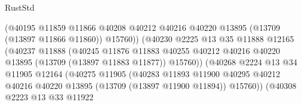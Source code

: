 \begin{lexlean}{RustStd}
\begin{coremodule}
                                        (@40195
                                          @11859
                                          @11866
                                          @40208
                                          @40212
                                          @40216
                                          @40220
                                          @13895
                                          (@13709 (@13897 @11866 @11860))
                                          @15760))
                                      (@40230
                                        @2225
                                        @13
                                        @35
                                        @11888
                                        @12165
                                        (@40237
                                          @11888
                                          (@40245
                                            @11876
                                            @11883
                                            @40255
                                            @40212
                                            @40216
                                            @40220
                                            @13895
                                            (@13709 (@13897 @11883 @11877))
                                            @15760))
                                        (@40268
                                          @2224
                                          @13
                                          @34
                                          @11905
                                          @12164
                                          (@40275
                                            @11905
                                            (@40283
                                              @11893
                                              @11900
                                              @40295
                                              @40212
                                              @40216
                                              @40220
                                              @13895
                                              (@13709 (@13897 @11900 @11894))
                                              @15760))
                                          (@40308
                                            @2223
                                            @13
                                            @33
                                            @11922

\end{coremodule}
\end{lexlean}
